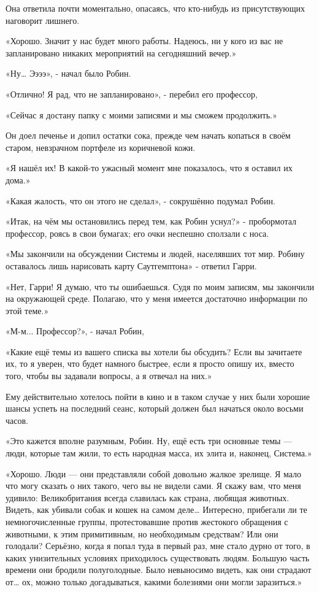 \documentclass[a4paper,12pt]{book}
\begin{document}
\par
Она ответила почти моментально, опасаясь, что кто-нибудь из присутствующих наговорит лишнего.
\par
«Хорошо. Значит у нас будет много работы. Надеюсь, ни у кого из вас не запланировано никаких мероприятий на сегодняшний вечер.»
\par
«Ну… Ээээ», - начал было Робин.
\par
«Отлично! Я рад, что не запланировано», - перебил его профессор,
\par
«Сейчас я достану папку с моими записями и мы сможем продолжить.»
\par
Он доел печенье и допил остатки сока, прежде чем начать копаться в своём старом, невзрачном портфеле из коричневой кожи.
\par
«Я нашёл их! В какой-то ужасный момент мне показалось, что я оставил их дома.»
\par
«Какая жалость, что он этого не сделал», - сокрушённо подумал Робин.
\par
«Итак, на чём мы остановились перед тем, как Робин уснул?» - пробормотал профессор, роясь в свои бумагах; его очки неспешно сползали с носа.
\par
«Мы закончили на обсуждении Системы и людей, населявших тот мир. Робину оставалось лишь нарисовать карту Саутгемптона» - ответил Гарри.
\par
«Нет, Гарри! Я думаю, что ты ошибаешься. Судя по моим записям, мы закончили на окружающей среде. Полагаю, что у меня имеется достаточно информации по этой теме.»
\par
«М-м... Профессор?», - начал Робин,
\par
«Какие ещё темы из вашего списка вы хотели бы обсудить? Если вы зачитаете их, то я уверен, что будет намного быстрее, если я просто опишу их, вместо того, чтобы вы задавали вопросы, а я отвечал на них.»
\par
Ему действительно хотелось пойти в кино и в таком случае у них были хорошие шансы успеть на последний сеанс, который должен был начаться около восьми часов.
\par
«Это кажется вполне разумным, Робин. Ну, ещё есть три основные темы — люди, которые там жили, то есть народная масса, их элита и, наконец, Система.»
\par
«Хорошо. Люди — они представляли собой довольно жалкое зрелище. Я мало что могу сказать о них такого, чего вы не видели сами. Я скажу вам, что меня удивило: Великобритания всегда славилась как страна, любящая животных. Видеть, как убивали собак и кошек на самом деле… Интересно, прибегали ли те немногочисленные группы, протестовавшие против жестокого обращения с животными, к этим примитивным, но необходимым средствам? Или они голодали? Серьёзно, когда я попал туда в первый раз, мне стало дурно от того, в каких унизительных условиях приходилось существовать людям. Большую часть времени они бродили полуголодные. Было невыносимо видеть, как они страдают от… ох, можно только догадываться, какими болезнями они могли заразиться.»
\end{document}
